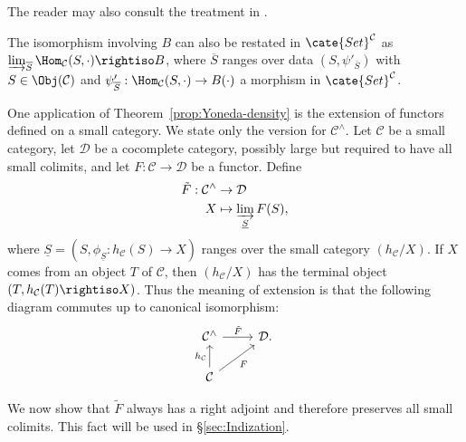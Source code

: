 The reader may also consult the treatment in \cite[pp. 76--77]{ML98}.

\begin{remark}\label{rem:Yoneda-density}
	The isomorphism involving $B$ can also be restated in $\cate{Set}^{\mathcal{C}}$ as
	$\varinjlim_{\overline S}\Hom_{\mathcal{C}}(S,\mathord\cdot)\rightiso B$,
	where $\overline S$ ranges over data $(S,\psi'_{\overline S})$ with
	$S\in\Obj(\mathcal{C})$ and
	$\psi'_{\overline S}:\Hom_{\mathcal{C}}(S,\mathord\cdot)\to B(\mathord\cdot)$
	a morphism in $\cate{Set}^{\mathcal{C}}$.
\end{remark}

One application of Theorem~\ref{prop:Yoneda-density} is the extension of functors defined on a small category. We state only the version for $\mathcal{C}^\wedge$. Let $\mathcal{C}$ be a small category, let $\mathcal{D}$ be a cocomplete category, possibly large but required to have all small colimits, and let $F:\mathcal{C}\to\mathcal{D}$ be a functor. Define
\begin{equation}\label{eqn:Yoneda-F-tilde}\begin{aligned}
	\tilde{F}: \mathcal{C}^\wedge & \to \mathcal{D} \\
	X & \mapsto \varinjlim_{\underline{S}} F(S),
\end{aligned}\end{equation}
where $\underline S=(S,\phi_{\underline S}:h_{\mathcal{C}}(S)\to X)$ ranges over the small category $(h_{\mathcal{C}}/X)$. If $X$ comes from an object $T$ of $\mathcal{C}$, then $(h_{\mathcal{C}}/X)$ has the terminal object $(T,h_{\mathcal{C}}(T)\rightiso X)$. Thus the meaning of extension is that the following diagram commutes up to canonical isomorphism:
\[\begin{tikzcd}
	\mathcal{C}^\wedge \arrow[r, "{\tilde{F}}"] & \mathcal{D}. \\
	\mathcal{C} \arrow[u, "{h_{\mathcal{C}}}"] \arrow[ru, "F"'] &
\end{tikzcd}\]

We now show that $\tilde F$ always has a right adjoint and therefore preserves all small colimits. This fact will be used in \S\ref{sec:Indization}.

